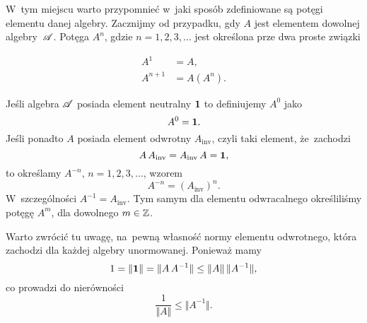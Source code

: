 \documentclass[a4paper,11pt]{article}
\begin{document}
\noindent
{} W~tym miejscu warto przypomnieć w~jaki sposób zdefiniowane są
potęgi elementu danej algebry. Zacznijmy od przypadku, gdy $A$ jest
elementem dowolnej algebry~$\mathcal{A}$. Potęga $A^{ n }$, gdzie
$n = 1, 2, 3, \ldots$ jest określona prze dwa proste związki

\vspace{\negVerSpaceFour}


\begin{subequations}

  \begin{align}
    \label{eq:Bratteli-Robinson-Operator-Algebras-ETC-Vol-I-s01-14-A}
    A^{ 1 } &= A, \\
    \label{eq:Bratteli-Robinson-Operator-Algebras-ETC-Vol-I-s01-14-B}
    A^{ n + 1 } &= A ( A^{ n } ).
  \end{align}

\end{subequations}


\noindent
Jeśli algebra $\mathcal{A}$ posiada element neutralny $\mathbf{1}$ to definiujemy
$A^{ 0 }$ jako
\begin{equation}
  \label{eq:Bratteli-Robinson-Operator-Algebras-ETC-Vol-I-s01-15}
  A^{ 0 } = \mathbf{1}.
\end{equation}
Jeśli ponadto $A$ posiada element odwrotny $A_{ \textrm{inv} }$, czyli taki
element, że~zachodzi
\begin{equation}
  \label{eq:Bratteli-Robinson-Operator-Algebras-ETC-Vol-I-s01-16}
  A \, A_{ \textrm{inv} } = A_{ \textrm{inv} } \, A = \mathbf{1},
\end{equation}
to określamy $A^{ -n }$, $n = 1, 2, 3, \ldots$, wzorem
\begin{equation}
  \label{eq:Bratteli-Robinson-Operator-Algebras-ETC-Vol-I-s01-17}
  A^{ -n } = ( A_{ \textrm{inv} } )^{ n }.
\end{equation}
W~szczególności $A^{ -1 } = A_{ \textrm{inv} }$. Tym samym dla elementu
odwracalnego określiliśmy potęgę $A^{ m }$, dla dowolnego $m \in \mathbb{Z}$.

\vspace{\VerSpaceFour}





\noindent
{} Warto zwrócić tu uwagę, na~pewną własność normy elementu
odwrotnego, która zachodzi dla każdej algebry unormowanej. Ponieważ mamy
\begin{equation}
  \label{eq:Bratteli-Robinson-Operator-Algebras-ETC-Vol-I-s01-18}
  1 = \Vert \mathbf{1} \Vert = \Vert A \, A^{ -1 } \Vert \leq \Vert A \Vert \, \Vert A^{ -1 } \Vert,
\end{equation}
co prowadzi do nierówności
\begin{equation}
  \label{eq:Bratteli-Robinson-Operator-Algebras-ETC-Vol-I-s01-19}
  \frac{ 1 }{ \Vert A \Vert } \leq \Vert A^{ -1 } \Vert.
\end{equation}
\end{document}
